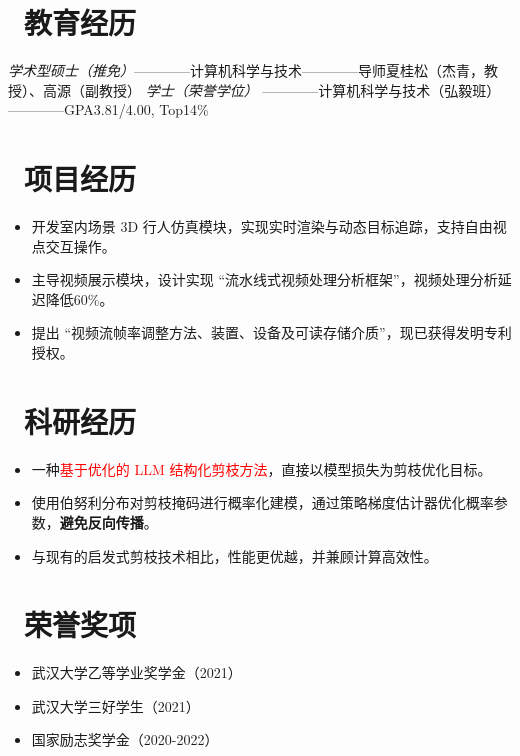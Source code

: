 \documentclass{resume}
\begin{document}
\section{\faGraduationCap\ 教育经历}
\textit{学术型硕士（推免）}————计算机科学与技术————导师夏桂松（杰青，教授）、高源（副教授）
\textit{学士（荣誉学位）} ————计算机科学与技术（弘毅班）————GPA3.81/4.00, Top14\% 

\section{\faTasks\ 项目经历}
\begin{itemize}
  \item 开发室内场景 3D 行人仿真模块，实现实时渲染与动态目标追踪，支持自由视点交互操作。
  \item 主导视频展示模块，设计实现 “流水线式视频处理分析框架”，视频处理分析延迟降低60\%。
  \item 提出 “视频流帧率调整方法、装置、设备及可读存储介质”，现已获得发明专利授权。%
\end{itemize}


\section{\faUsers\ 科研经历}
\begin{itemize}
  \item 一种\textcolor{red}{基于优化的 LLM 结构化剪枝方法}，直接以模型损失为剪枝优化目标。
  \item 使用伯努利分布对剪枝掩码进行概率化建模，通过策略梯度估计器优化概率参数，\textbf{避免反向传播}。
  \item 与现有的启发式剪枝技术相比，性能更优越，并兼顾计算高效性。
\end{itemize}

\section{\faTrophy\ 荣誉奖项}
\begin{itemize}[parsep=0.5ex]
  \item 武汉大学乙等学业奖学金（2021）
  \item 武汉大学三好学生（2021）
  \item 国家励志奖学金（2020-2022）
\end{itemize}

%
%
\end{document}
